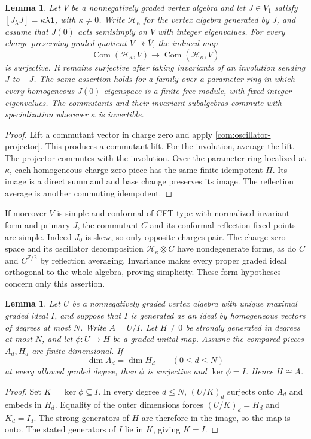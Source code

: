 \documentclass[11pt,a4paper]{amsart}
\numberwithin{equation}{section}
\newtheorem{lemma}[theorem]{Lemma}
\theoremstyle{definition}
\theoremstyle{remark}
\newcommand{\Z}{\mathbb Z}
\newcommand{\Com}{\operatorname{Com}}
\begin{document}
\begin{lemma}
\label{com:heisenberg-quotient}
Let $V$ be a nonnegatively graded vertex algebra and let $J\in V_1$
satisfy $[J_\lambda J]=\kappa\lambda\mathbf1$, with $\kappa\ne0$.
Write $\mathcal H_\kappa$ for the vertex algebra generated by $J$,
and assume that $J(0)$ acts semisimply on $V$ with integer eigenvalues. For every charge-preserving graded
quotient $V\twoheadrightarrow\overline V$, the induced map
$$
 \Com(\mathcal H_\kappa,V)\longrightarrow
       \Com(\mathcal H_\kappa,\overline V)
$$
is surjective. It remains surjective after taking invariants of
an involution sending $J$ to $-J$. The same assertion holds for a
family over a parameter ring in which every homogeneous
$J(0)$-eigenspace is a finite free module, with fixed integer eigenvalues.
The commutants and their invariant subalgebras commute with
specialization wherever $\kappa$ is invertible.
\end{lemma}
\begin{proof}
Lift a commutant vector in charge zero and apply
\eqref{com:oscillator-projector}. This produces a commutant lift.
For the involution, average the lift. The projector commutes with
the involution. Over the parameter ring localized at $\kappa$,
each homogeneous charge-zero piece has the same finite idempotent
$\Pi$. Its image is a direct summand and base change preserves
its image. The reflection average is another commuting
idempotent. 
\end{proof}

If moreover $V$ is simple and conformal of CFT type with normalized
invariant form and primary $J$, the commutant $C$ and its conformal reflection
fixed points are simple. Indeed $J_0$ is skew, so only opposite
charges pair. The charge-zero space and its oscillator decomposition
$\mathcal H_\kappa\otimes C$ have nondegenerate forms, as do $C$
and $C^{\Z/2}$ by reflection averaging. Invariance makes every proper
graded ideal orthogonal to the whole algebra, proving simplicity.
These form hypotheses concern only this assertion.

\begin{lemma}
\label{com:finite-image}
Let $U$ be a nonnegatively graded vertex algebra with unique maximal
graded ideal $I$, and suppose that $I$ is generated as an ideal by
homogeneous vectors of degrees at most $N$. Write $A=U/I$. Let $H\ne0$ be strongly generated in degrees at most
$N$, and let $\phi:U\to H$ be a graded unital map. Assume the
compared pieces $A_d,H_d$ are finite dimensional. If
$$
                  \dim A_d=\dim H_d\qquad(0\le d\le N)
$$
at every allowed graded degree, then $\phi$ is surjective and
$\ker\phi=I$. Hence $H\cong A$.
\end{lemma}
\begin{proof}
Set $K=\ker\phi\subseteq I$. In every degree $d\le N$,
$(U/K)_d$ surjects onto $A_d$ and embeds in $H_d$. Equality of
the outer dimensions forces $(U/K)_d=H_d$ and $K_d=I_d$.
The strong generators of $H$ are therefore in the image, so the
map is onto. The stated generators of $I$ lie in $K$, giving
$K=I$. 
\end{proof}
\end{document}

